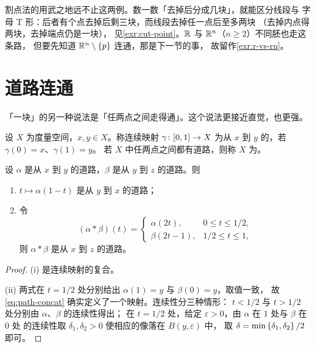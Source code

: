 \begin{remark}
  割点法的用武之地远不止这两例。数一数「去掉后分成几块」，就能区分线段与
  字母 T 形：后者有个点去掉后剩三块，而线段去掉任一点后至多两块
  （去掉内点得两块，去掉端点仍是一块），
  见\cref{exr:cut-point}。\(\mathbb{R}\) 与 \(\mathbb{R}^{n}\)（\(n \ge 2\)）不同胚也走这条路，
  但要先知道 \(\mathbb{R}^{n} \setminus \left\{p\right\}\) 连通，那是下一节的事，
  故留作\cref{exr:r-vs-rn}。
\end{remark}

\section{道路连通}
\label{sec:path-connected}

「一块」的另一种说法是「任两点之间走得通」。这个说法更接近直觉，也更强。

\begin{definition}[道路与道路连通]
  \label{def:path-connected}
  设 \(X\) 为度量空间，\(x,y \in X\)。称连续映射 \(\gamma \colon [0,1] \to X\)
  为从 \(x\) 到 \(y\) 的，若 \(\gamma(0)=x\)、\(\gamma(1)=y\)。
  若 \(X\) 中任两点之间都有道路，则称 \(X\) 为。
\end{definition}

\begin{proposition}[道路的反向与拼接]
  \label{prop:path-ops}
  设 \(\alpha\) 是从 \(x\) 到 \(y\) 的道路，\(\beta\) 是从 \(y\) 到 \(z\) 的道路。则
  \begin{enumerate}[label=(\roman*)]
    \item \(t \mapsto \alpha(1-t)\) 是从 \(y\) 到 \(x\) 的道路；
    \item 令
      \begin{equation}
        \label{eq:path-concat}
        (\alpha * \beta)(t) =
        \begin{cases}
          \alpha(2t), & 0 \le t \le 1/2, \\
          \beta(2t-1), & 1/2 \le t \le 1,
        \end{cases}
      \end{equation}
      则 \(\alpha * \beta\) 是从 \(x\) 到 \(z\) 的道路。
  \end{enumerate}
\end{proposition}

\begin{proof}
  (i) 是连续映射的复合。

  (ii) 两式在 \(t=1/2\) 处分别给出 \(\alpha(1)=y\) 与 \(\beta(0)=y\)，取值一致，
  故\cref{eq:path-concat} 确实定义了一个映射。连续性分三种情形：
  \(t<1/2\) 与 \(t>1/2\) 处分别由 \(\alpha\)、\(\beta\) 的连续性得出；
  在 \(t=1/2\) 处，给定 \(\varepsilon>0\)，由 \(\alpha\) 在 \(1\) 处与 \(\beta\) 在 \(0\) 处
  的连续性取 \(\delta_{1},\delta_{2}>0\) 使相应的像落在 \(B(y,\varepsilon)\) 中，
  取 \(\delta = \min\left\{\delta_{1},\delta_{2}\right\}/2\) 即可。
\end{proof}

